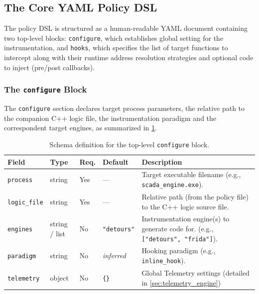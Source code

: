 \subsection{The Core YAML Policy DSL}
\label{subsec:yaml_policy_dsl}

The policy DSL is structured as a human-readable YAML document containing two top-level blocks: \texttt{configure}, which establishes global setting for the instrumentation, and \texttt{hooks}, which specifies the list of target functions to intercept along with their runtime address resolution strategies and optional code to inject (pre/post callbacks).

\subsubsection{The \texttt{configure} Block}

The \texttt{configure} section declares target process parameters, the relative path to the companion C++ logic file, the instrumentation paradigm and the correspondent target engines, as summarized in \cref{tab:configure_schema}.

\begin{table}[H]
	\centering
	\small
	\begin{tabular}{@{}llllp{6.0cm}@{}}
		\toprule
		\textbf{Field} & \textbf{Type} & \textbf{Req.} & \textbf{Default} & \textbf{Description} \\
		\midrule
		\texttt{process}      & string         & Yes & ---               & Target executable filename (e.g., \texttt{scada\_engine.exe}). \\
		\texttt{logic\_file}  & string         & Yes & ---               & Relative path (from the policy file) to the C++ logic source file. \\
		\texttt{engines}      & string / list  & No  & \texttt{"detours"} & Instrumentation engine(s) to generate code for. (e.g., \texttt{["detours", "frida"]}). \\
		\texttt{paradigm}     & string         & No  & \textit{inferred} & Hooking paradigm (e.g., \texttt{inline\_hook}). \\
		\texttt{telemetry}     & object         & No  & \texttt{\{\}} & Global Telemetry settings (detailed in \cref{sec:telemetry_engine}) \\
		\bottomrule
	\end{tabular}
	\caption{Schema definition for the top-level \texttt{configure} block.}
	\label{tab:configure_schema}
\end{table}

